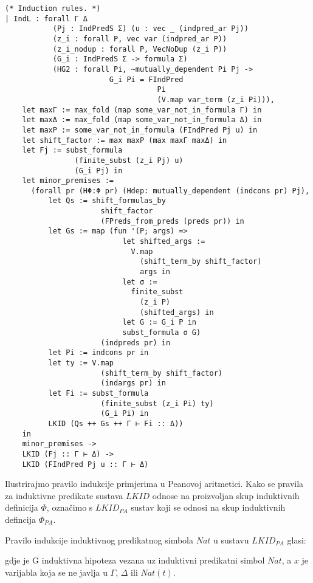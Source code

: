 \begin{verbatim}
(* Induction rules. *)
| IndL : forall Γ Δ
           (Pj : IndPredS Σ) (u : vec _ (indpred_ar Pj))
           (z_i : forall P, vec var (indpred_ar P))
           (z_i_nodup : forall P, VecNoDup (z_i P))
           (G_i : IndPredS Σ -> formula Σ)
           (HG2 : forall Pi, ~mutually_dependent Pi Pj ->
                        G_i Pi = FIndPred
                                   Pi
                                   (V.map var_term (z_i Pi))),
    let maxΓ := max_fold (map some_var_not_in_formula Γ) in
    let maxΔ := max_fold (map some_var_not_in_formula Δ) in
    let maxP := some_var_not_in_formula (FIndPred Pj u) in
    let shift_factor := max maxP (max maxΓ maxΔ) in
    let Fj := subst_formula
                (finite_subst (z_i Pj) u)
                (G_i Pj) in
    let minor_premises :=
      (forall pr (HΦ:Φ pr) (Hdep: mutually_dependent (indcons pr) Pj),
          let Qs := shift_formulas_by
                      shift_factor
                      (FPreds_from_preds (preds pr)) in
          let Gs := map (fun '(P; args) =>
                           let shifted_args :=
                             V.map
                               (shift_term_by shift_factor)
                               args in
                           let σ :=
                             finite_subst
                               (z_i P)
                               (shifted_args) in
                           let G := G_i P in
                           subst_formula σ G)
                      (indpreds pr) in
          let Pi := indcons pr in
          let ty := V.map
                      (shift_term_by shift_factor)
                      (indargs pr) in
          let Fi := subst_formula
                      (finite_subst (z_i Pi) ty)
                      (G_i Pi) in
          LKID (Qs ++ Gs ++ Γ ⊢ Fi :: Δ))
    in
    minor_premises ->
    LKID (Fj :: Γ ⊢ Δ) ->
    LKID (FIndPred Pj u :: Γ ⊢ Δ)
\end{verbatim}

Ilustrirajmo pravilo indukcije primjerima u Peanovoj aritmetici.
Kako se pravila za induktivne predikate sustava \(\mathit{LKID}\) odnose na proizvoljan skup induktivnih definicija \(\Phi\),
označimo s \(\mathit{LKID}_{\mathit{PA}}\)  sustav koji se odnosi na skup induktivnih defincija \(\Phi_{\mathit{PA}}\).
\begin{example}
  Pravilo indukcije induktivnog predikatnog simbola \(\mathit{Nat}\)
  u sustavu \(\mathit{LKID}_{\mathit{PA}}\) glasi:
  \begin{prooftree}
  \end{prooftree}
  \noindent gdje je G induktivna hipoteza vezana uz induktivni predikatni simbol \(\mathit{Nat}\),
  a \(x\) je varijabla koja se ne javlja u \(\Gamma\), \(\Delta\) ili \(\mathit{Nat}(t)\).
\end{example}

